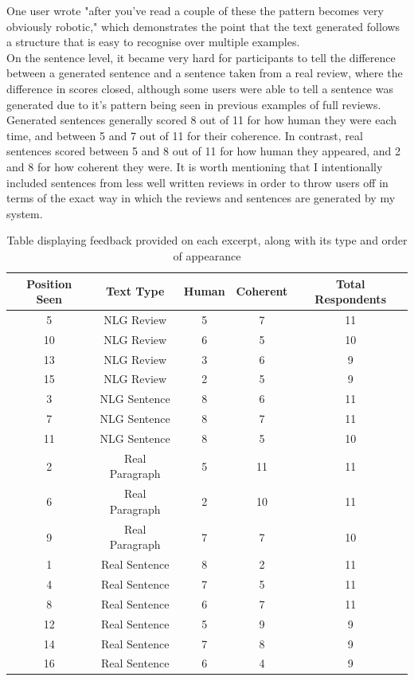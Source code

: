 One user wrote "after you've read a couple of these the pattern becomes very obviously robotic," which demonstrates the point that the text generated follows a structure that is easy to recognise over multiple examples.\\

On the sentence level, it became very hard for participants to tell the difference between a generated sentence and a sentence taken from a real review, where the difference in scores closed, although some users were able to tell a sentence was generated due to it's pattern being seen in previous examples of full reviews. Generated sentences generally scored 8 out of 11 for how human they were each time, and between 5 and 7 out of 11 for their coherence. In contrast, real sentences scored between 5 and 8 out of 11 for how human they appeared, and 2 and 8 for how coherent they were. It is worth mentioning that I intentionally included sentences from less well written reviews in order to throw users off in terms of the exact way in which the reviews and sentences are generated by my system.\\
\begin{table}

\begin{center}
	\begin{tabular}{||c c c c c||} 
		\hline
		Position Seen & Text Type & Human & Coherent & Total Respondents \\ [0.5ex] 
		\hline\hline
		5 & NLG Review & 5  & 7 & 11 \\ 
		\hline
		10& NLG Review& 6& 5&10\\
		\hline
		13& NLG Review& 3& 6&9\\
		\hline
		15& NLG Review& 2& 5&9\\
		\hline
		3& NLG Sentence& 8& 6&11\\
		\hline
		7& NLG Sentence& 8& 7& 11\\
		\hline
		11& NLG Sentence& 8& 5&10\\
		\hline
		2& Real Paragraph& 5& 11& 11\\
		\hline
		6& Real Paragraph& 2& 10& 11\\
		\hline
		9& Real Paragraph& 7& 7&10\\
		\hline
		1& Real Sentence& 8& 2& 11\\
		\hline
		4& Real Sentence& 7&5&11\\
		\hline
		8& Real Sentence& 6& 7&11\\
		\hline
		12& Real Sentence& 5& 9&9\\
		\hline
		14& Real Sentence& 7& 8&9\\
		\hline
		16& Real Sentence& 6& 4&9\\		[1ex] 
		

		\hline
	\end{tabular}
\end{center}
\caption{Table displaying feedback provided on each excerpt, along with its type and order of appearance}
\end{table}

